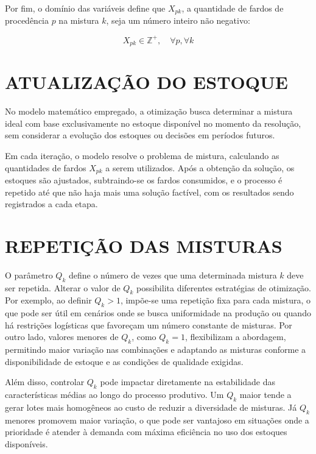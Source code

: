 \documentclass[
    12pt,                %
    openright,           %
    oneside,             %
    a4paper,             %
    english,             %
    spanish,             %
    brazil               %
]{ufscar}
\begin{document}
Por fim, o domínio das variáveis define que $X_{pk}$, a quantidade de fardos de procedência $p$ na mistura $k$, seja um número inteiro não negativo:

\begin{equation}
X_{pk} \in \mathbb{Z}^+, \quad \forall p, \forall k
\end{equation}

\section{ATUALIZAÇÃO DO ESTOQUE}

No modelo matemático empregado, a otimização busca determinar a mistura ideal com base exclusivamente no estoque disponível no momento da resolução, sem considerar a evolução dos estoques ou decisões em períodos futuros.

Em cada iteração, o modelo resolve o problema de mistura, calculando as quantidades de fardos \(X_{pk}\) a serem utilizados. Após a obtenção da solução, os estoques são ajustados, subtraindo-se os fardos consumidos, e o processo é repetido até que não haja mais uma solução factível, com os resultados sendo registrados a cada etapa.

\section{REPETIÇÃO DAS MISTURAS}

O parâmetro \( Q_k \) define o número de vezes que uma determinada mistura \( k \) deve ser repetida. Alterar o valor de \( Q_k \) possibilita diferentes estratégias de otimização. Por exemplo, ao definir \( Q_k > 1 \), impõe-se uma repetição fixa para cada mistura, o que pode ser útil em cenários onde se busca uniformidade na produção ou quando há restrições logísticas que favoreçam um número constante de misturas. Por outro lado, valores menores de \( Q_k \), como \( Q_k = 1 \), flexibilizam a abordagem, permitindo maior variação nas combinações e adaptando as misturas conforme a disponibilidade de estoque e as condições de qualidade exigidas.

Além disso, controlar \( Q_k \) pode impactar diretamente na estabilidade das características médias ao longo do processo produtivo. Um \( Q_k \) maior tende a gerar lotes mais homogêneos ao custo de reduzir a diversidade de misturas. Já \( Q_k \) menores promovem maior variação, o que pode ser vantajoso em situações onde a prioridade é atender à demanda com máxima eficiência no uso dos estoques disponíveis.
\end{document}
